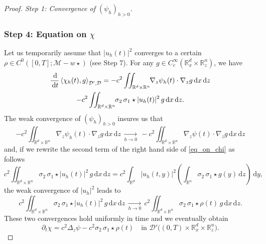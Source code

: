 \documentclass[10pt]{amsart}
\theoremstyle{definition}
\newcommand{\R}{\mathbb{R}}
\newcommand{\ud}{\, {\mathrm{d}}}
\begin{document}
\begin{proof}[Proof. Step 1: Convergence of $(\psi_{h})_{h>0}$]
\subsubsection*{Step 4: Equation on $\chi$} Let us temporarily assume that
$|u_{h}(t)|^{2}$ converges to a certain $\rho\in C^{0}([0,T];\mathcal{M}-w\star)$ (see Step 7).
For any $g\in C_{c}^{\infty}(\R_{x}^{d}\times\R_{z}^{n})$, we have
\begin{multline}\label{eq_on_chi}
\frac{\ud}{\ud t}\left\langle\chi_{h}(t),g\right\rangle_{\mathcal{D}',\mathcal{D}}=-c^{2}\iint_{\R^{d}\times\R^{n}}\hspace*{-1mm}\nabla_{z}\psi_{h}(t)\cdot\nabla_{z}g\ud x\ud z\\
-c^{2}\iint_{\R^{d}\times\R^{n}}\hspace*{-1mm}\sigma_{2}\,\sigma_{1}\star|u_{h}(t)|^{2}\,g\ud x\ud z.
\end{multline}
The weak convergence of $(\psi_{h})_{h>0}$ insures us that
\[
-c^{2}\iint_{\R^{d}\times\R^{n}}\nabla_{z}\psi_{h}(t)\cdot\nabla_{z}g\ud x\ud z\,\underset{h\to 0}{\to}\,-c^{2}\iint_{\R^{d}\times\R^{n}}\nabla_{z}\psi(t)\cdot\nabla_{z}g\ud x\ud z
\]
and, if we rewrite the second term of the right hand side of \eqref{eq_on_chi} as follows
\[
c^{2}\iint_{\R^{d}\times\R^{n}}\sigma_{2}\,\sigma_{1}\star|u_{h}(t)|^{2}\,g\ud x\ud z=c^{2}\int_{\R^{d}}|u_{h}(t,y)|^{2}\left(\int_{\R^{n}}\sigma_{2}\,\sigma_{1}\star g(y)\ud z\right)\ud y,
\]
the weak convergence of $|u_{h}|^{2}$ leads to
\[
c^{2}\iint_{\R^{d}\times\R^{n}}\sigma_{2}\,\sigma_{1}\star|u_{h}(t)|^{2}\,g\ud x\ud z\,\underset{h\to 0}{\to}\,c^{2}\iint_{\R^{d}\times\R^{n}}\sigma_{2}\,\sigma_{1}\star\rho(t)\,g\ud x\ud z.
\]
These two convergences hold uniformly in time and we eventually obtain
\[
\partial_{t}\chi=c^{2}\Delta_{z}\psi-c^{2}\sigma_{2}\,\sigma_{1}\star\rho(t)\quad\text{in }\mathcal{D}'\bigl((0,T)\times\R_{x}^{d}\times\R_{z}^{n}\bigr).
\]


\end{proof}
\end{document}
